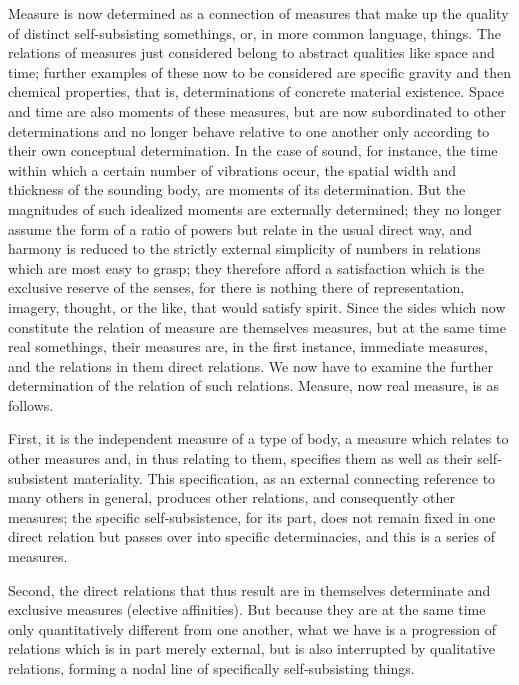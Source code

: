 Measure is now determined as a connection of measures
that make up the quality of distinct self-subsisting somethings,
or, in more common language, things.
The relations of measures just considered belong
to abstract qualities like space and time;
further examples of these now to be considered
are specific gravity and then chemical properties,
that is, determinations of concrete material existence.
Space and time are also moments of these measures,
but are now subordinated to other determinations
and no longer behave relative to one another
only according to their own conceptual determination.
In the case of sound, for instance,
the time within which a certain number of vibrations occur,
the spatial width and thickness of the sounding body,
are moments of its determination.
But the magnitudes of such idealized moments are externally determined;
they no longer assume the form of a ratio of powers
but relate in the usual direct way,
and harmony is reduced to the strictly
external simplicity of numbers in relations
which are most easy to grasp;
they therefore afford a satisfaction
which is the exclusive reserve of the senses,
for there is nothing there of representation,
imagery, thought, or the like,
that would satisfy spirit.
Since the sides which now constitute
the relation of measure are themselves measures,
but at the same time real somethings, their measures are,
in the first instance, immediate measures,
and the relations in them direct relations.
We now have to examine the further determination of
the relation of such relations.
Measure, now real measure, is as follows.

First, it is the independent measure of a type of body,
a measure which relates to other measures
and, in thus relating to them, specifies them as
well as their self-subsistent materiality.
This specification, as an external
connecting reference to many others in general,
produces other relations, and consequently other measures;
the specific self-subsistence, for its part,
does not remain fixed in one direct relation
but passes over into specific determinacies,
and this is a series of measures.

Second, the direct relations that thus result are in themselves
determinate and exclusive measures (elective affinities).
But because they are at the same time only
quantitatively different from one another,
what we have  is a progression of relations
which is in part merely external,
but is also interrupted by qualitative relations,
forming a nodal line of specifically self-subsisting things.

